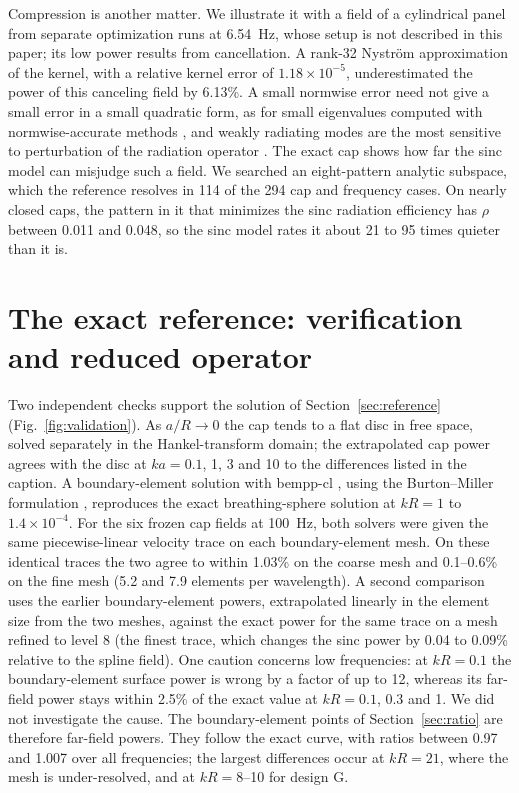 \documentclass[preprint,12pt]{elsarticle}
\begin{document}
Compression is another matter. We illustrate it with a field of a cylindrical panel from separate optimization runs at 6.54~Hz, whose setup is not described in this paper; its low power results from cancellation. A rank-32 Nystr\"om approximation of the kernel, with a relative kernel error of $1.18\times10^{-5}$, underestimated the power of this canceling field by 6.13\%. %
A small normwise error need not give a small error in a small quadratic form, as for small eigenvalues computed with normwise-accurate methods \cite{DemmelVeselic1992}, and weakly radiating modes are the most sensitive to perturbation of the radiation operator \cite{CunefareCurrey1994}.
The exact cap shows how far the sinc model can misjudge such a field. We searched an eight-pattern analytic subspace, which the reference resolves in 114 of the 294 cap and frequency cases. On nearly closed caps, the pattern in it that minimizes the sinc radiation efficiency has $\rho$ between 0.011 and 0.048, so the sinc model rates it about 21 to 95 times quieter than it is. %

\section{The exact reference: verification and reduced operator}
\label{app:verification}
Two independent checks support the solution of Section~\ref{sec:reference} (Fig.~\ref{fig:validation}). As $a/R\to0$ the cap tends to a flat disc in free space, solved separately in the Hankel-transform domain; the extrapolated cap power agrees with the disc at $ka=0.1$, 1, 3 and 10 to the differences listed in the caption. %
A boundary-element solution with bempp-cl \cite{BetckeScroggs2021}, using the Burton--Miller formulation \cite{BurtonMiller1971}, reproduces the exact breathing-sphere solution at $kR=1$ to $1.4\times10^{-4}$. For the six frozen cap fields at 100~Hz, both solvers were given the same piecewise-linear velocity trace on each boundary-element mesh. On these identical traces the two agree to within 1.03\% on the coarse mesh and 0.1--0.6\% on the fine mesh (5.2 and 7.9 elements per wavelength). %
A second comparison uses the earlier boundary-element powers, extrapolated linearly in the element size from the two meshes, against the exact power for the same trace on a mesh refined to level 8 (the finest trace, which changes the sinc power by 0.04 to 0.09\% relative to the spline field). %
One caution concerns low frequencies: at $kR=0.1$ the boundary-element surface power is wrong by a factor of up to 12, whereas its far-field power stays within 2.5\% of the exact value at $kR=0.1$, 0.3 and 1. We did not investigate the cause. The boundary-element points of Section~\ref{sec:ratio} are therefore far-field powers. They follow the exact curve, with ratios between 0.97 and 1.007 over all frequencies; the largest differences occur at $kR=21$, where the mesh is under-resolved, and at $kR=8$--10 for design G. %
\end{document}
